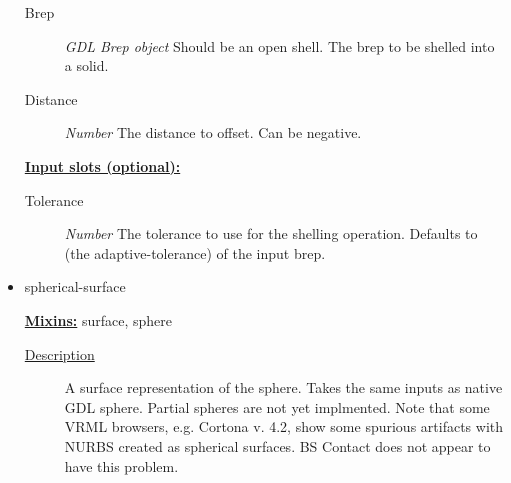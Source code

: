 \documentclass [11pt]{book}
\begin{document}
\begin{itemize}
\begin{description}
\item [Brep]
\emph{GDL Brep object} Should be an open shell.
The brep to be shelled into a solid.


\item [Distance]
\emph{Number} The distance to offset. Can be negative.


\end{description}






\textbf{
\underline{Input slots (optional):}}

\begin{description}

\item [Tolerance]
\emph{Number} The tolerance to use for the shelling operation.
Defaults to (the adaptive-tolerance) of the input brep.


\end{description}







\item {}spherical-surface


\textbf{
\underline{Mixins:}} surface, sphere





\begin{description}

\item [
\underline{Description}]


A surface representation of the sphere. Takes the same inputs as native GDL sphere. Partial spheres are not yet implmented.
Note that some VRML browsers, e.g. Cortona v. 4.2, show some spurious artifacts with NURBS 
created as spherical surfaces. BS Contact does not appear to have this problem.



\end{description}




\begin{figure}
\begin{lrbox}{\boxedverb}
\begin{minipage}{\linewidth}
{\small

\begin{verbatim}
                  

\end{verbatim}}
\end{minipage}
\end{lrbox}
\end{figure}
\end{itemize}
\end{document}
